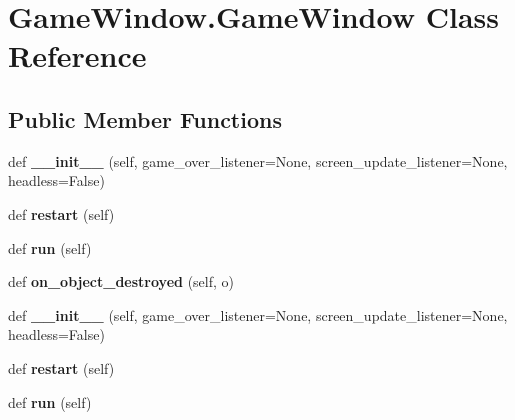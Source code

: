 \hypertarget{classGameWindow_1_1GameWindow}{}\section{Game\+Window.\+Game\+Window Class Reference}
\label{classGameWindow_1_1GameWindow}
\subsection*{Public Member Functions}
\begin{DoxyCompactItemize}
\item 
def {\bfseries \+\_\+\+\_\+init\+\_\+\+\_\+} (self, game\+\_\+over\+\_\+listener=None, screen\+\_\+update\+\_\+listener=None, headless=False)\hypertarget{classGameWindow_1_1GameWindow_a02010cc4371544b655369e6fd5794d71}{}\label{classGameWindow_1_1GameWindow_a02010cc4371544b655369e6fd5794d71}

\item 
def {\bfseries restart} (self)\hypertarget{classGameWindow_1_1GameWindow_a39325b3e2eb66949d2dd15e495fa6642}{}\label{classGameWindow_1_1GameWindow_a39325b3e2eb66949d2dd15e495fa6642}

\item 
def {\bfseries run} (self)\hypertarget{classGameWindow_1_1GameWindow_a87dc06fb2818940a4cf0d6318719e048}{}\label{classGameWindow_1_1GameWindow_a87dc06fb2818940a4cf0d6318719e048}

\item 
def {\bfseries on\+\_\+object\+\_\+destroyed} (self, o)\hypertarget{classGameWindow_1_1GameWindow_abf3b77ea8ac501d676eb86846da66835}{}\label{classGameWindow_1_1GameWindow_abf3b77ea8ac501d676eb86846da66835}

\item 
def {\bfseries \+\_\+\+\_\+init\+\_\+\+\_\+} (self, game\+\_\+over\+\_\+listener=None, screen\+\_\+update\+\_\+listener=None, headless=False)\hypertarget{classGameWindow_1_1GameWindow_a02010cc4371544b655369e6fd5794d71}{}\label{classGameWindow_1_1GameWindow_a02010cc4371544b655369e6fd5794d71}

\item 
def {\bfseries restart} (self)\hypertarget{classGameWindow_1_1GameWindow_a39325b3e2eb66949d2dd15e495fa6642}{}\label{classGameWindow_1_1GameWindow_a39325b3e2eb66949d2dd15e495fa6642}

\item 
def {\bfseries run} (self)\hypertarget{classGameWindow_1_1GameWindow_a87dc06fb2818940a4cf0d6318719e048}{}\label{classGameWindow_1_1GameWindow_a87dc06fb2818940a4cf0d6318719e048}


\end{DoxyCompactItemize}
